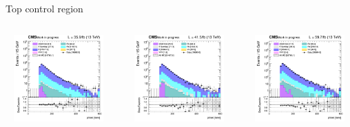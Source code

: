 \documentclass[8pt]{beamer}
\begin{document}
\begin{frame}{Top control region}
\vspace{-5pt}
\begin{columns}
		\begin{column}{0.33\textwidth}
			\begin{center}
     			\includegraphics[width=1.0\textwidth, height=95pt]{figs/2016/log_cratio_ttbarCR_ll_METcorrected_pt.png}
    		\end{center}		
		\end{column}
		\begin{column}{0.33\textwidth}
			\begin{center}
     			\includegraphics[width=1.0\textwidth, height=95pt]{figs/2017/log_cratio_ttbarCR_ll_METcorrected_pt.png}
    		\end{center}		
		\end{column}
		\begin{column}{0.33\textwidth}
			\begin{center}
     			\includegraphics[width=1.0\textwidth, height=95pt]{figs/2018/log_cratio_ttbarCR_ll_METcorrected_pt.png}
    		\end{center}		
		\end{column}
\end{columns} \vfill
\end{frame}
\end{document}
